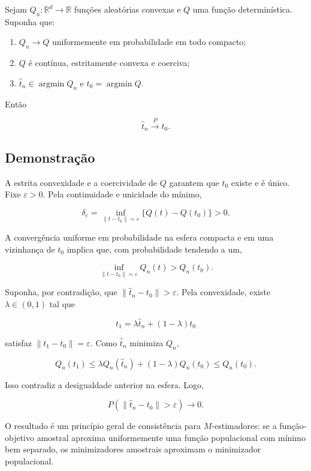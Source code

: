 \documentclass[
  letterpaper,
  DIV=11,
  numbers=noendperiod]{scrreprt}
\providecommand{\tightlist}{%
  \setlength{\itemsep}{0pt}\setlength{\parskip}{0pt}}\usepackage{longtable,booktabs,array}
\begin{document}
Sejam \(Q_n:\mathbb R^d\to\mathbb R\) funções aleatórias convexas e
\(Q\) uma função determinística. Suponha que:

\begin{enumerate}
\def\labelenumi{\arabic{enumi}.}
\tightlist
\item
  \(Q_n\to Q\) uniformemente em probabilidade em todo compacto;
\item
  \(Q\) é contínua, estritamente convexa e coerciva;
\item
  \(\widehat t_n\in\operatorname{argmin}Q_n\) e
  \(t_0=\operatorname{argmin}Q\).
\end{enumerate}

Então

\[
\widehat t_n\xrightarrow{P}t_0.
\]

\subsection*{Demonstração}\label{demonstrauxe7uxe3o-22}

A estrita convexidade e a coercividade de \(Q\) garantem que \(t_0\)
existe e é único. Fixe \(\varepsilon>0\). Pela continuidade e unicidade
do mínimo,

\[
\delta_\varepsilon
=
\inf_{\|t-t_0\|=\varepsilon}
\{Q(t)-Q(t_0)\}
>0.
\]

A convergência uniforme em probabilidade na esfera compacta e em uma
vizinhança de \(t_0\) implica que, com probabilidade tendendo a um,

\[
\inf_{\|t-t_0\|=\varepsilon}Q_n(t)
>
Q_n(t_0).
\]

Suponha, por contradição, que \(\|\widehat t_n-t_0\|>\varepsilon\). Pela
convexidade, existe \(\lambda\in(0,1)\) tal que

\[
t_1=\lambda\widehat t_n+(1-\lambda)t_0
\]

satisfaz \(\|t_1-t_0\|=\varepsilon\). Como \(\widehat t_n\) minimiza
\(Q_n\),

\[
Q_n(t_1)
\leq
\lambda Q_n(\widehat t_n)+(1-\lambda)Q_n(t_0)
\leq
Q_n(t_0).
\]

Isso contradiz a desigualdade anterior na esfera. Logo,

\[
P(\|\widehat t_n-t_0\|>\varepsilon)
\to 0.
\]

\begin{tcolorbox}[enhanced jigsaw, colback=white, leftrule=.75mm, colbacktitle=quarto-callout-tip-color!10!white, breakable, titlerule=0mm, bottomtitle=1mm, title=\textcolor{quarto-callout-tip-color}{\faLightbulb}\hspace{0.5em}{Interpretação}, colframe=quarto-callout-tip-color-frame, toprule=.15mm, opacityback=0, bottomrule=.15mm, opacitybacktitle=0.6, arc=.35mm, toptitle=1mm, rightrule=.15mm, coltitle=black, left=2mm]

O resultado é um princípio geral de consistência para \(M\)-estimadores:
se a função-objetivo amostral aproxima uniformemente uma função
populacional com mínimo bem separado, os minimizadores amostrais
aproximam o minimizador populacional.

\end{tcolorbox}
\end{document}
